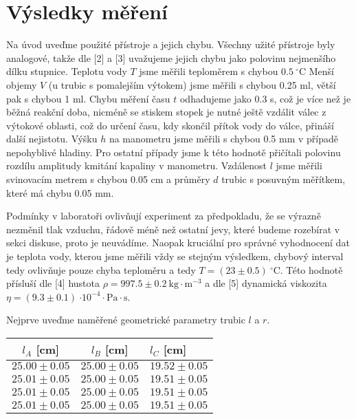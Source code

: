 \documentclass[a4paper]{article}
\begin{document}
\section*{Výsledky měření}
\par Na úvod uveďme použité přístroje a jejich chybu. Všechny užité přístroje byly analogové, takže dle [2] a [3] uvažujeme jejich chybu jako polovinu nejmenšího dílku stupnice. Teplotu vody $T$ jsme měřili teploměrem s chybou $0.5\:^{\circ}\mathrm{C}$ Menší objemy $V$ (u trubic s pomalejším výtokem) jsme měřili s chybou 0.25 ml, větší pak s chybou 1 ml. Chybu měření času $t$ odhadujeme jako 0.3 s, což je více než je běžná reakční doba, nicméně se stiskem stopek je nutné ještě vzdálit válec z výtokové oblasti, což do určení času, kdy skončil přítok vody do válce, přináší další nejistotu. Výšku $h$ na manometru jsme měřili s chybou 0.5 mm v případě nepohyblivé hladiny. Pro ostatní případy jsme k této hodnotě přičítali polovinu rozdílu amplitudy kmitání kapaliny v manometru. Vzdálenost $l$ jsme měřili svinovacím metrem s chybou 0.05 cm a průměry $d$ trubic s posuvným měřítkem, které má chybu 0.05 mm.
\par Podmínky v laboratoři ovlivňují experiment za předpokladu, že se výrazně nezměnil tlak vzduchu, řádově méně než ostatní jevy, které budeme rozebírat v sekci diskuse, proto je neuvádíme. Naopak kruciální pro správné vyhodnocení dat je teplota vody, kterou jsme měřili vždy se stejným výsledkem, chybový interval tedy ovlivňuje pouze chyba teploměru a tedy $T = (23\pm0.5)\:^{\circ}\mathrm{C}$. Této hodnotě přísluší dle [4] hustota $\rho = 997.5\pm0.2 \: \mathrm{kg \cdot m^{-3}}$ a dle [5] dynamická viskozita $\eta = (9.3\pm0.1)\: \mathrm{\cdot 10^{-4} \cdot Pa \cdot s}$.
\par Nejprve uveďme naměřené geometrické parametry trubic $l$ a $r$.
\begin{center}
    \label{tab:title}
    \begin{tabular}{ | c | c |  p{3cm} |} \hline
    $l_{A}$ [cm] & $l_{B}$ [cm] & $l_{C}$ [cm]   \\ \hline
    $25.00\pm0.05$ & $25.00\pm0.05$ & $19.52\pm0.05$ \\ \hline
    $25.01\pm0.05$ & $25.00\pm0.05$ & $19.51\pm0.05$ \\ \hline
    $25.01\pm0.05$ & $25.00\pm0.05$ & $19.51\pm0.05$ \\ \hline
    $25.01\pm0.05$ & $25.00\pm0.05$ & $19.51\pm0.05$  \\ \hline
    \end{tabular}
\end{center}
\end{document}
